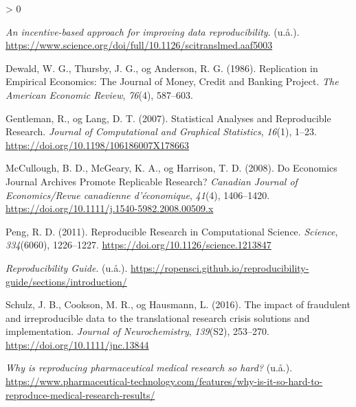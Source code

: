 \documentclass[
  12pt,
  norsk,
]{article}
\newlength{\cslhangindent}
\newenvironment{CSLReferences}[2] %
 {%
  \setlength{\parindent}{0pt}
  \ifodd #1 \everypar{\setlength{\hangindent}{\cslhangindent}}\ignorespaces\fi
  \ifnum #2 > 0
  \setlength{\parskip}{#2\baselineskip}
  \fi
 }%
 {}
\begin{document}
\hypertarget{refs}{}
\begin{CSLReferences}{1}{0}
\leavevmode\hypertarget{ref-Science.org}{}%
\emph{An incentive-based approach for improving data reproducibility}.
(u.å.).
\url{https://www.science.org/doi/full/10.1126/scitranslmed.aaf5003}

\leavevmode\hypertarget{ref-dewald1986}{}%
Dewald, W. G., Thursby, J. G., og Anderson, R. G. (1986). Replication in
{Empirical Economics}: {The Journal} of {Money}, {Credit} and {Banking
Project}. \emph{The American Economic Review}, \emph{76}(4), 587--603.

\leavevmode\hypertarget{ref-gentleman2007}{}%
Gentleman, R., og Lang, D. T. (2007). Statistical Analyses and
Reproducible Research. \emph{Journal of Computational and Graphical
Statistics}, \emph{16}(1), 1--23.
\url{https://doi.org/10.1198/106186007X178663}

\leavevmode\hypertarget{ref-mccullough2008}{}%
McCullough, B. D., McGeary, K. A., og Harrison, T. D. (2008). Do
Economics Journal Archives Promote Replicable Research? \emph{Canadian
Journal of Economics/Revue canadienne d'économique}, \emph{41}(4),
1406--1420. \url{https://doi.org/10.1111/j.1540-5982.2008.00509.x}

\leavevmode\hypertarget{ref-peng2011}{}%
Peng, R. D. (2011). Reproducible {Research} in {Computational Science}.
\emph{Science}, \emph{334}(6060), 1226--1227.
\url{https://doi.org/10.1126/science.1213847}

\leavevmode\hypertarget{ref-Git-reproducabilty}{}%
\emph{Reproducibility Guide}. (u.å.).
\url{https://ropensci.github.io/reproducibility-guide/sections/introduction/}

\leavevmode\hypertarget{ref-schulz2016}{}%
Schulz, J. B., Cookson, M. R., og Hausmann, L. (2016). The impact of
fraudulent and irreproducible data to the translational research crisis
{{}} solutions and implementation. \emph{Journal of Neurochemistry},
\emph{139}(S2), 253--270. \url{https://doi.org/10.1111/jnc.13844}

\leavevmode\hypertarget{ref-Pharm-tech}{}%
\emph{Why is reproducing pharmaceutical medical research so hard?}
(u.å.).
\url{https://www.pharmaceutical-technology.com/features/why-is-it-so-hard-to-reproduce-medical-research-results/}

\end{CSLReferences}
\end{document}
